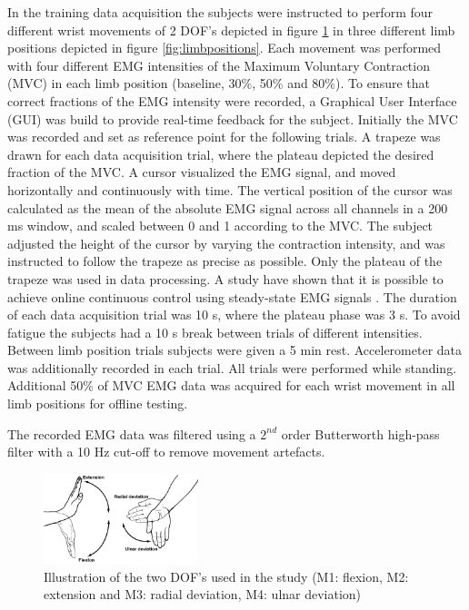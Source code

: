 \begin{multicols}{2}
In the training data acquisition the subjects were instructed to perform four different wrist movements of 2 DOF's depicted in figure \ref{fig:wristmovement} in three different limb positions depicted in figure \ref{fig:limbpositions}. Each movement was performed with four different EMG intensities of the Maximum Voluntary Contraction (MVC) in each limb position (baseline, 30\%, 50\% and 80\%). To ensure that correct fractions of the EMG intensity were recorded, a Graphical User Interface (GUI) was build to provide real-time feedback for the subject. Initially the MVC was recorded and set as reference point for the following trials. A trapeze was drawn for each data acquisition trial, where the plateau depicted the desired fraction of the MVC. A cursor visualized the EMG signal, and moved horizontally and continuously with time. The vertical position of the cursor was calculated as the mean of the absolute EMG signal across all channels in a 200 ms window, and scaled between 0 and 1 according to the MVC. The subject adjusted the height of the cursor by varying the contraction intensity, and was instructed to follow the trapeze as precise as possible. Only the plateau of the trapeze was used in data processing. A study have shown that it is possible to achieve online continuous control using steady-state EMG signals \cite{mobarak2014}. The duration of each data acquisition trial was 10 s, where the plateau phase was 3 s. To avoid fatigue the subjects had a 10 s break between trials of different intensities. Between limb position trials subjects were given a 5 min rest. Accelerometer data was additionally recorded in each trial. All trials were performed while standing.
Additional 50\% of MVC EMG data was acquired for each wrist movement in all limb positions for offline testing.

The recorded EMG data was filtered using a $2^{nd}$ order Butterworth high-pass filter with a 10 Hz cut-off to remove movement artefacts. 

\begin{figure}[H]
	\centering
	\includegraphics[width=0.4\textwidth]{figures/paperFigures/wristmovement}  %
	\caption{Illustration of the two DOF's used in the study (M1: flexion, M2: extension and M3: radial deviation, M4: ulnar deviation)}
	\label{fig:wristmovement}  %
\end{figure}


\end{multicols}
